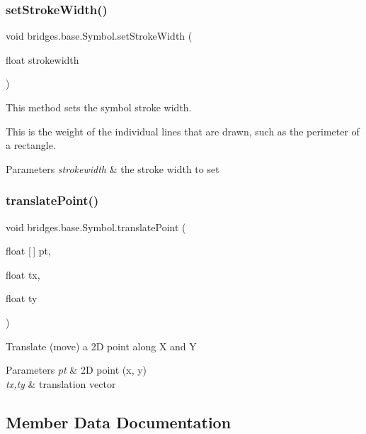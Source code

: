 \subsubsection{\texorpdfstring{set\+Stroke\+Width()}{setStrokeWidth()}}
{\footnotesize\ttfamily void bridges.\+base.\+Symbol.\+set\+Stroke\+Width (\begin{DoxyParamCaption}\item[{float}]{strokewidth }\end{DoxyParamCaption})}



This method sets the symbol stroke width. 

This is the weight of the individual lines that are drawn, such as the perimeter of a rectangle.


\begin{DoxyParams}{Parameters}
{\em strokewidth} & the stroke width to set \\
\hline
\end{DoxyParams}
\mbox{\label{classbridges_1_1base_1_1_symbol_affb384e1e7e22d7bcb6ca0bf0d4ebbc3}} 
\subsubsection{\texorpdfstring{translate\+Point()}{translatePoint()}}
{\footnotesize\ttfamily void bridges.\+base.\+Symbol.\+translate\+Point (\begin{DoxyParamCaption}\item[{float \mbox{[}$\,$\mbox{]}}]{pt,  }\item[{float}]{tx,  }\item[{float}]{ty }\end{DoxyParamCaption})\hspace{0.3cm}{\ttfamily [protected]}}

Translate (move) a 2D point along X and Y 
\begin{DoxyParams}{Parameters}
{\em pt} & 2D point (x, y) \\
\hline
{\em tx,ty} & translation vector \\
\hline
\end{DoxyParams}


\subsection{Member Data Documentation}
\mbox{\label{classbridges_1_1base_1_1_symbol_a44f00712b6c584c7778ed9de4c394cbf}} 
